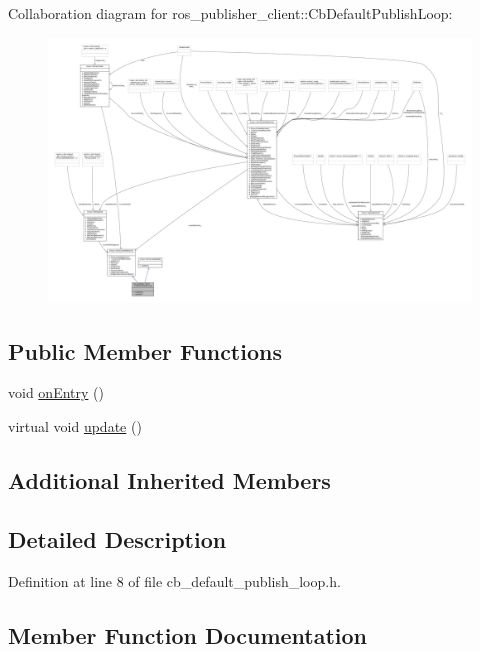 Collaboration diagram for ros\+\_\+publisher\+\_\+client\+:\+:Cb\+Default\+Publish\+Loop\+:
\nopagebreak
\begin{figure}[H]
\begin{center}
\leavevmode
\includegraphics[width=350pt]{classros__publisher__client_1_1CbDefaultPublishLoop__coll__graph}
\end{center}
\end{figure}
\subsection*{Public Member Functions}
\begin{DoxyCompactItemize}
\item 
void \hyperlink{classros__publisher__client_1_1CbDefaultPublishLoop_ae4d12184e4d5fb8cab0eb34e60757739}{on\+Entry} ()
\item 
virtual void \hyperlink{classros__publisher__client_1_1CbDefaultPublishLoop_aac7546e32e37fd833eac47d3976463b3}{update} ()
\end{DoxyCompactItemize}
\subsection*{Additional Inherited Members}


\subsection{Detailed Description}


Definition at line 8 of file cb\+\_\+default\+\_\+publish\+\_\+loop.\+h.



\subsection{Member Function Documentation}
